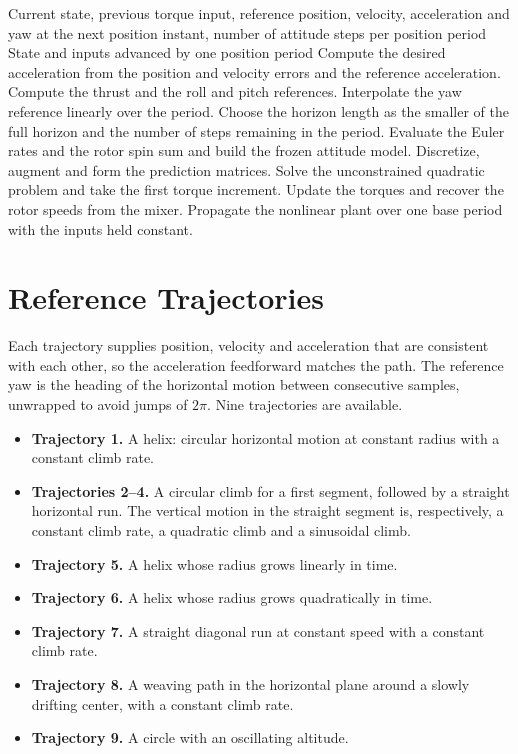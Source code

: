 \documentclass[11pt,a4paper]{article}
\numberwithin{equation}{section}
\begin{document}
\begin{algorithm}[H]
\caption{One position period of the cascaded controller}\label{alg:loop}
\begin{algorithmic}[1]
\Require Current state, previous torque input, reference position, velocity, acceleration and yaw at the next position instant, number of attitude steps per position period
\Ensure State and inputs advanced by one position period
\State Compute the desired acceleration from the position and velocity errors and the reference acceleration.
\State Compute the thrust and the roll and pitch references.
\State Interpolate the yaw reference linearly over the period.
  \State Choose the horizon length as the smaller of the full horizon and the number of steps remaining in the period.
  \State Evaluate the Euler rates and the rotor spin sum and build the frozen attitude model.
  \State Discretize, augment and form the prediction matrices.
  \State Solve the unconstrained quadratic problem and take the first torque increment.
  \State Update the torques and recover the rotor speeds from the mixer.
  \State Propagate the nonlinear plant over one base period with the inputs held constant.
\EndFor
\end{algorithmic}
\end{algorithm}

\section{Reference Trajectories}\label{sec:reference}

Each trajectory supplies position, velocity and acceleration that are consistent with each other, so the acceleration feedforward matches the path. The reference yaw is the heading of the horizontal motion between consecutive samples, unwrapped to avoid jumps of $2\pi$. Nine trajectories are available.

\begin{itemize}
\item \textbf{Trajectory 1.} A helix: circular horizontal motion at constant radius with a constant climb rate.
\item \textbf{Trajectories 2--4.} A circular climb for a first segment, followed by a straight horizontal run. The vertical motion in the straight segment is, respectively, a constant climb rate, a quadratic climb and a sinusoidal climb.
\item \textbf{Trajectory 5.} A helix whose radius grows linearly in time.
\item \textbf{Trajectory 6.} A helix whose radius grows quadratically in time.
\item \textbf{Trajectory 7.} A straight diagonal run at constant speed with a constant climb rate.
\item \textbf{Trajectory 8.} A weaving path in the horizontal plane around a slowly drifting center, with a constant climb rate.
\item \textbf{Trajectory 9.} A circle with an oscillating altitude.
\end{itemize}
\end{document}
